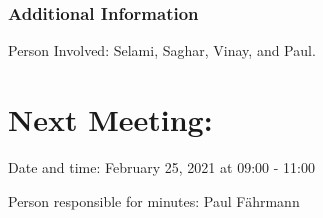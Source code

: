 \documentclass[11pt]{meetingmins} %
\begin{document}
\subsubsection{Additional Information}
\begin{hiddensubitems}
    \item Person Involved: Selami, Saghar, Vinay, and Paul.
\end{hiddensubitems}



\section{Next Meeting:}
\begin{hiddensubitems}
    \item
    Date and time: February 25, 2021 at 09:00 - 11:00
    \item
    Person responsible for minutes: Paul Fährmann
\end{hiddensubitems}
\end{document}
